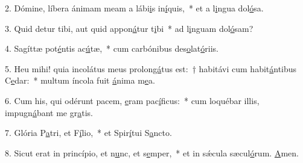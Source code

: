 2. Dómine, líbera ánimam meam a lábi\uline{i}s in\uline{í}quis,~* et a l\uline{i}ngua dol\uline{ó}sa.\par 
3. Quid detur tibi, aut quid appon\uline{á}tur t\uline{i}bi~* ad l\uline{i}nguam dol\uline{ó}sam?\par 
4. Sagíttæ pot\uline{é}ntis ac\uline{ú}tæ,~* cum carbónibus des\uline{o}lat\uline{ó}riis.\par 
5. Heu mihi! quia incolátus meus prolon\uline{gá}tus est:~† habitávi cum habit\uline{á}ntibus C\uline{e}dar:~* multum íncola fuit \uline{á}nima m\uline{e}a.\par 
6. Cum his, qui odérunt pacem, \uline{e}ram pac\uline{í}ficus:~* cum loquébar illis, impugn\uline{á}bant me gr\uline{a}tis.\par 
7. Glória P\uline{a}tri, et F\uline{í}lio,~* et Spir\uline{í}tui S\uline{a}ncto.\par 
8. Sicut erat in princípio, et n\uline{u}nc, et s\uline{e}mper,~* et in sǽcula sæcul\uline{ó}rum. \uline{A}men.\par 
